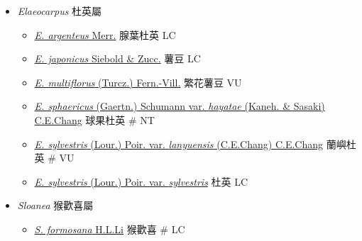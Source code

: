 
  \begin{itemize}
 \item[] \textit{Elaeocarpus} 杜英屬
                                
  \begin{itemize}
        \item[] \href{http://www.theplantlist.org/tpl1.1/search?q=Elaeocarpus+argenteus}{\textit{E. argenteus} Merr.}   腺葉杜英   LC
        \item[] \href{http://www.theplantlist.org/tpl1.1/search?q=Elaeocarpus+japonicus}{\textit{E. japonicus} Siebold \& Zucc.}   薯豆   LC
        \item[] \href{http://www.theplantlist.org/tpl1.1/search?q=Elaeocarpus+multiflorus}{\textit{E. multiflorus} (Turcz.) Fern.-Vill.}   繁花薯豆   VU
        \item[] \href{http://www.theplantlist.org/tpl1.1/search?q=Elaeocarpus+sphaericus+var.+hayatae}{\textit{E. sphaericus} (Gaertn.) Schumann var. \textit{hayatae} (Kaneh. \& Sasaki) C.E.Chang}   球果杜英  \# NT
        \item[] \href{http://www.theplantlist.org/tpl1.1/search?q=Elaeocarpus+sylvestris+var.+lanyuensis}{\textit{E. sylvestris} (Lour.) Poir. var. \textit{lanyuensis} (C.E.Chang) C.E.Chang}   蘭嶼杜英  \# VU
        \item[] \href{http://www.theplantlist.org/tpl1.1/search?q=Elaeocarpus+sylvestris+var.+sylvestris}{\textit{E. sylvestris} (Lour.) Poir. var. \textit{sylvestris}}   杜英   LC
  \end{itemize}
 \item[] \textit{Sloanea} 猴歡喜屬
                                
  \begin{itemize}
        \item[] \href{http://www.theplantlist.org/tpl1.1/search?q=Sloanea+formosana}{\textit{S. formosana} H.L.Li}   猴歡喜  \# LC
  \end{itemize}
  \end{itemize}
